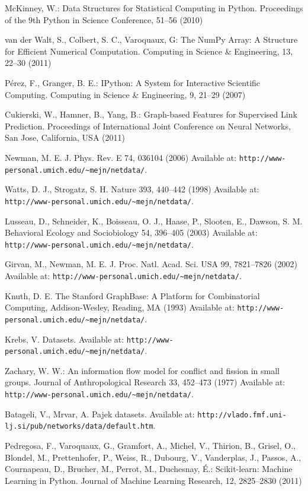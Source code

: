 \documentclass{llncs}
\begin{document}
\begin{thebibliography}{26}
McKinney, W.:
Data Structures for Statistical Computing in Python.
Proceedings of the 9th Python in Science Conference, 51--56 (2010)

van der Walt, S., Colbert, S. C., Varoquaux, G:
The NumPy Array: A Structure for Efficient Numerical Computation.
Computing in Science \& Engineering, 13, 22--30 (2011)

P{\'e}rez, F., Granger, B. E.:
IPython: A System for Interactive Scientific Computing.
Computing in Science \& Engineering, 9, 21--29 (2007)

Cukierski, W., Hamner, B., Yang, B.:
Graph-based Features for Supervised Link Prediction.
Proceedings of International Joint Conference on Neural Networks, San Jose, California, USA (2011)

Newman, M. E. J.
Phys. Rev. E 74, 036104 (2006)
Available at: \texttt{http://www-personal.umich.edu/\~{}mejn/netdata/}.

Watts, D. J., Strogatz, S. H.
Nature 393, 440--442 (1998) 
Available at: \texttt{http://www-personal.umich.edu/\~{}mejn/netdata/}.

Lusseau, D., Schneider, K., Boisseau, O. J., Haase, P., Slooten, E., Dawson, S. M.
Behavioral Ecology and Sociobiology 54, 396--405 (2003)
Available at: \texttt{http://www-personal.umich.edu/\~{}mejn/netdata/}.

Girvan, M., Newman, M. E. J.
Proc. Natl. Acad. Sci. USA 99, 7821--7826 (2002)
Available at: \texttt{http://www-personal.umich.edu/\~{}mejn/netdata/}.

Knuth, D. E.
The Stanford GraphBase: A Platform for Combinatorial Computing, Addison-Wesley, Reading, MA (1993)
Available at: \texttt{http://www-personal.umich.edu/\~{}mejn/netdata/}.

Krebs, V.
Datasets. 
Available at: \texttt{http://www-personal.umich.edu/\~{}mejn/netdata/}.

Zachary, W. W.:
An information flow model for conflict and fission in small groups.
Journal of Anthropological Research 33, 452--473 (1977)
Available at: \texttt{http://www-personal.umich.edu/\~{}mejn/netdata/}.

Batageli, V., Mrvar, A.
Pajek datasets. 
Available at: \texttt{http://vlado.fmf.uni-lj.si/pub/networks/data/default.htm}.

Pedregosa, F., Varoquaux, G., Gramfort, A., Michel, V., Thirion, B., Grisel, O., Blondel, M., Prettenhofer, P., Weiss, R., Dubourg, V., Vanderplas, J., Passos, A., Cournapeau, D., Brucher, M., Perrot, M., Duchesnay, {\'E}.:
Scikit-learn: Machine Learning in Python.
Journal of Machine Learning Research, 12, 2825--2830 (2011) 

\end{thebibliography}
\end{document}
